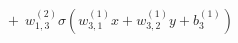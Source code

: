 \documentclass[preview]{standalone}
\begin{document}
\begin{align*}
+ \ \ w_{1,3}^{(2)} \sigma(w_{3,1}^{(1)}x + w_{3,2}^{(1)}y +b_3^{(1)})
\end{align*}
\end{document}

